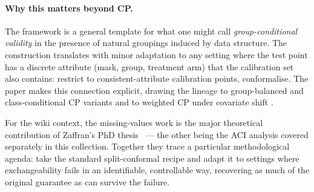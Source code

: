 \documentclass[letterpaper,11pt,leqno]{article}
\newcommand{\bib}{paper.bib}
\begin{document}
\paragraph{Why this matters beyond CP.} The framework is a general template for what one might call \emph{group-conditional validity} in the presence of natural groupings induced by data structure. The construction translates with minor adaptation to any setting where the test point has a discrete attribute (mask, group, treatment arm) that the calibration set also contains: restrict to consistent-attribute calibration points, conformalise. The paper makes this connection explicit, drawing the lineage to group-balanced and class-conditional CP variants \cite{angelopoulos2022gentle} and to weighted CP under covariate shift \cite{tibshirani2019weighted}.

For the wiki context, the missing-values work is the major theoretical contribution of Zaffran's PhD thesis \cite{zaffran2024phd}~--- the other being the ACI analysis covered separately in this collection. Together they trace a particular methodological agenda: take the standard split-conformal recipe and adapt it to settings where exchangeability fails in an identifiable, controllable way, recovering as much of the original guarantee as can survive the failure.


\end{document}
